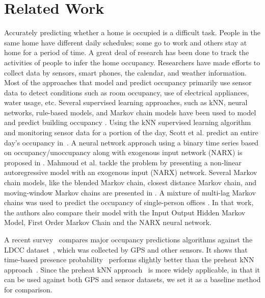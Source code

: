 \section{Related Work}
Accurately predicting whether a home is occupied is a difficult task. 
People in the same home have different daily schedules; 
some go to work and others stay at home for a period of time.  
A great deal of research has been done to track the activities of people 
to infer the home occupancy. 
Researchers have made efforts to collect data by sensors, smart phones, 
the calendar, and weather information. 
Most of the approaches that model and predict occupancy primarily use sensor data to detect conditions 
such as room occupancy, use of electrical appliances, water usage, etc.
Several supervised learning approaches, such as kNN, neural networks, rule-based models, 
and Markov chain models have been used to model and predict building occupancy 
\cite{scott2011preheat,alrazgan2011learning,mahmoud2013behavioural,erickson2010occupancy,beltran2014optimal}.  
Using the kNN supervised learning algorithm and monitoring sensor data 
for a portion of the day, 
Scott et al. predict an entire day's occupancy in~\cite{scott2011preheat}. 
A neural network approach using a binary time series based on 
occupancy/unoccupancy along with exogenous input network (NARX) is 
proposed in \cite{mahmoud2013behavioural}. 
Mahmoud et al. tackle the problem by presenting a non-linear autoregressive 
model with an exogenous input (NARX) network. 
Several Markov chain models, like the blended Markov chain, 
closest distance Markov chain, 
and moving-window Markov chains are presented in \cite{erickson2010occupancy}. 
A mixture of multi-lag Markov chains was used to predict the occupancy of 
single-person offices \cite{manna2013learning}. 
In that work, the authors also compare their model with the Input Output Hidden Markov Model, 
First Order Markov Chain and the NARX neural network. 

A recent survey~\cite{kleiminger2014predicting} compares major occupancy 
predictions algorithms against the LDCC dataset~\cite{kiukkonen2010towards}, which was collected by 
GPS and other sensors. 
It shows that time-based presence probability~\cite{krumm2011learning} performs slightly better than the preheat kNN approach~\cite{scott2011preheat}. 
Since the preheat kNN approach~\cite{scott2011preheat} is more widely applicable,  
in that it can be used against both GPS and sensor datasets, 
we set it as a baseline method for comparison. 

